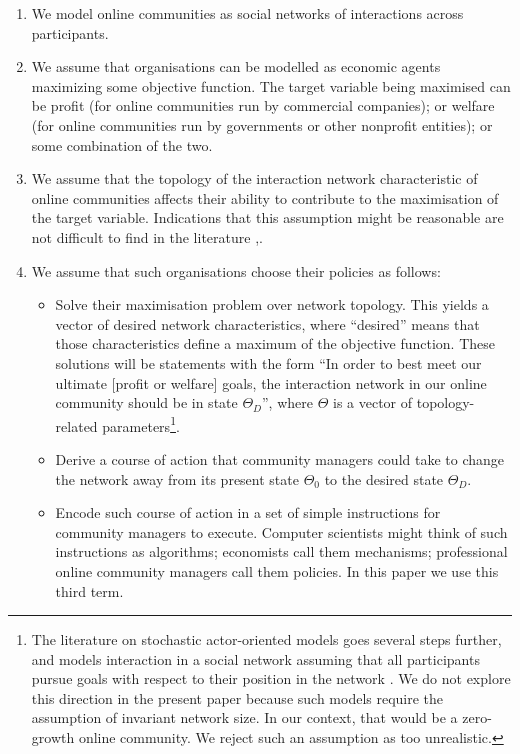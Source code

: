 \documentclass{bmcart}
\begin{document}
\begin{enumerate}
\item We model online communities as social networks of interactions across participants. 
\item We assume that organisations can be modelled as economic agents maximizing some objective function. The target variable being maximised can be profit (for online communities run by commercial companies); or welfare (for online communities run by governments or other nonprofit entities); or some combination of the two. 
\item We assume that the topology of the interaction network characteristic of online communities affects their ability to contribute to the maximisation of the target variable. Indications that this assumption might be reasonable are not difficult to find in the literature \cite{tapscott2008wikinomics},\cite{slegg2014facebook}.
\item We assume that such organisations choose their policies as follows: 
    \begin{itemize} 
	\item Solve their maximisation problem over network topology. This yields a vector of desired network characteristics, where ``desired'' means that those characteristics define a maximum of the objective function. These solutions will be statements with the form ``In order to best meet our ultimate [profit or welfare] goals, the interaction network in our online community should be in state $\Theta_D$'', where $\Theta$ is a vector of topology-related parameters\footnote{The literature on stochastic actor-oriented models goes several steps further, and models interaction in a social network assuming that all participants pursue goals with respect to their position in the network \cite{snijders1996stochastic}. We do not explore this direction in the present paper because such models require the assumption of invariant network size. In our context, that would be a zero-growth online community. We reject such an assumption as too unrealistic.}.
	\item Derive a course of action that community managers could take to change the network away from its present state $\Theta_0$ to the desired state $\Theta_D$.
	\item Encode such course of action in a set of simple instructions for community managers to execute. Computer scientists might think of such instructions as algorithms; economists call them mechanisms; professional online community managers call them policies. In this paper we use this third term. 
    \end{itemize}
\end{enumerate}
\end{document}
